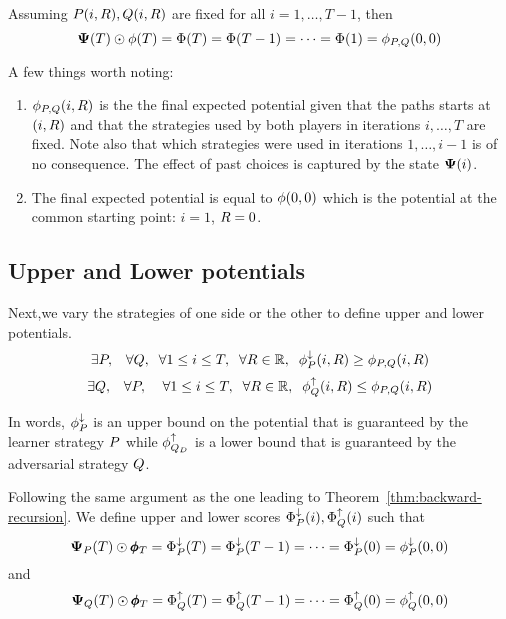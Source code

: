 \documentclass{article}[12pt]
\begin{document}
\begin{theorem} \label{thm:backward-recursion}
Assuming $ P(i,R), Q(i,R)$ are fixed for all
$i=1,\ldots,T-1$, then
\[
  {\bf \Psi}(T)\odot \phi(T)=\Phi(T)=\Phi(T-1)=\cdots=\Phi(1)=\phi_{P,Q}(0,0)
  \]
\end{theorem}

A few things worth noting:
\begin{enumerate}
\item $\phi_{P,Q}(i,R)$ is the the final expected potential
  given that the paths starts at $(i,R)$ and that
  the strategies used by both players in iterations $i,\ldots,T$ are fixed. Note
  also that which strategies were used in iterations $1,\ldots,i-1$ is
  of no consequence. The effect of past choices is captured by the
  state ${\bf \Psi}(i)$.
\item
  The final expected potential is equal to $\phi(0,0)$ which is the
  potential at the common starting point: $i=1$, $R=0$.
\end{enumerate}

\subsection{Upper and Lower potentials}
Next,we vary the strategies of one side or the other to define upper
and lower potentials.
\begin{equation} \label{eqn:upperPotentials}
  \exists P, \;\;\; \forall Q,\;\; \forall 1\leq i \leq
  T,\;\; \forall R \in \mathbb{R},\;\; \phi_{P}^{\downarrow}(i,R) \geq \phi_{P,Q}(i,R)
\end{equation}
\begin{equation} \label{eqn:lowerPotentials}
  \exists Q, \;\;\; \forall P, \;\; \;\; \forall 1\leq i \leq
  T,\;\; \forall R \in \mathbb{R},\;\; \phi_{Q}^{\uparrow}(i,R) \leq \phi_{P,Q}(i,R)
\end{equation}

In words, $\phi_{P}^{\downarrow}$ is an upper bound on the potential that is 
guaranteed by the learner strategy $P$ while $\phi_{Q_D}^{\uparrow}$
is a lower bound that is guaranteed by the adversarial
strategy $Q$.

Following the same argument as the one leading to
Theorem~\ref{thm:backward-recursion}. We define upper and lower scores
$\Phi_{P}^{\downarrow}(i),\Phi_{Q}^{\uparrow}(i)$ such that
\begin{equation} \label{eqn:upper-recursion}
  {\bf \Psi}_{P}(T)\odot \pmb{\phi}_{T}=\Phi_{P}^{\downarrow}(T)=\Phi_{P}^{\downarrow}(T-1)=\cdots=\Phi_{P}^{\downarrow}(0)=\phi_{P}^{\downarrow}(0,0)
\end{equation}
and
\begin{equation} \label{eqn:lower-recursion}
  {\bf \Psi}_{Q}(T)\odot \pmb{\phi}_{T}=\Phi_{Q}^{\uparrow}(T)=\Phi_{Q}^{\uparrow}(T-1)=\cdots=\Phi_{Q}^{\uparrow}(0)=\phi_{Q}^{\uparrow}(0,0)
\end{equation}
\end{document}
